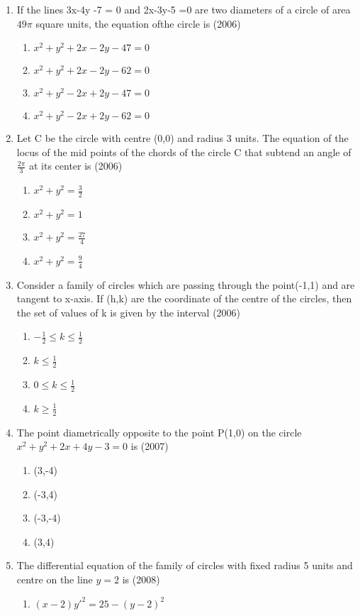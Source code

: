 \documentclass[12pt]{article}
\begin{document}
\begin{enumerate}
\item If the lines 3x-4y -7 = 0 and 2x-3y-5 =0 are two diameters of a circle of area $49\pi$ square units, the equation ofthe circle is (2006)
\begin{enumerate}
\item $x^2+y^2+2x-2y-47=0$
\item $x^2+y^2+2x-2y-62=0$
\item $x^2+y^2-2x+2y-47=0$
\item $x^2+y^2-2x+2y-62=0$
\end{enumerate}
\item Let C be the circle with centre (0,0) and radius 3 units. The equation of the locus of the mid points of the chords of the circle C that subtend an angle of $\frac{2\pi}{3}$ at its center is (2006)
\begin{enumerate}
\item $x^2+y^2=\frac{3}{2}$
\item $x^2+y^2=1$
\item $x^2+y^2=\frac{27}{4}$
\item $x^2+y^2=\frac{9}{4}$
\end{enumerate}
\item  Consider a family of circles which are passing through the point(-1,1) and are tangent to x-axis. If (h,k) are the coordinate of the centre of the circles, then the set of values of k is given by the interval (2006)
\begin{enumerate}
\item $-\frac{1}{2}\leq k\leq \frac{1}{2}$
\item $k\leq \frac{1}{2}$
\item $0\leq k\leq \frac{1}{2}$
\item $k\geq \frac{1}{2}$
\end{enumerate}
\item  The point diametrically opposite to the point P(1,0) on the circle $x^2+y^2+2x+4y-3=0$ is (2007)
\begin{enumerate}
\item (3,-4)
\item (-3,4)
\item (-3,-4)
\item (3,4)
\end{enumerate}
\item The differential equation of the family of circles with fixed radius 5 units and centre on the line $y=2$ is (2008)
\begin{enumerate}
\item $(x-2)y'^2 =25-(y-2)^2$

\end{enumerate}
\end{enumerate}
\end{document}
